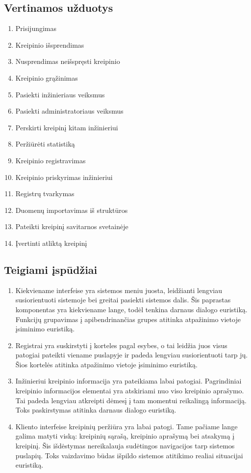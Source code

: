 \newpage	

\subsection{Vertinamos užduotys}
	\begin{enumerate}
	\item Prisijungimas
	\item Kreipinio išsprendimas
	\item Nusprendimas neišspręsti kreipinio
	\item Kreipinio grąžinimas
	\item Pasiekti inžinieriaus veiksmus
	\item Pasiekti administratoriaus veiksmus
	\item Perskirti kreipinį kitam inžinieriui
	\item Peržiūrėti statistiką
	\item Kreipinio registravimas
	\item Kreipinio priskyrimas inžinieriui
	\item Registrų tvarkymas
	\item Duomenų importavimas iš struktūros
	\item Pateikti kreipinį savitarnos svetainėje
	\item Įvertinti atliktą kreipinį
	\end{enumerate}
	
\newpage	
	
\subsection{Teigiami įspūdžiai}
	\begin{enumerate}
	\item Kiekviename interfeise yra sistemos meniu juosta, leidžianti lengviau susiorientuoti sistemoje bei greitai pasiekti sistemos dalis.
	Šis paprastas komponentas yra kiekviename lange, todėl tenkina darnaus dialogo euristiką.
	Funkcijų grupavimas į apibendrinančias grupes atitinka atpažinimo vietoje įsiminimo euristiką.
	\item Registrai yra suskirstyti į korteles pagal esybes, o tai leidžia juos visus patogiai pateikti viename puslapyje ir padeda lengviau susiorientuoti tarp jų.
	Šios kortelės atitinka atpažinimo vietoje įsiminimo euristiką.
	\item Inžinieriui kreipinio informacija yra pateikiama labai patogiai. Pagrindiniai kreipinio informacijos elementai yra atskiriami nuo viso kreipinio aprašymo.
	Tai padeda lengviau atkreipti dėmesį į tam momentui reikalingą informaciją.
	Toks paskirstymas atitinka darnaus dialogo euristiką.
	\item Kliento interfeise kreipinių peržiūra yra labai patogi.
	Tame pačiame lange galima matyti viską: kreipinių sąrašą, kreipinio aprašymą bei atsakymą į kreipinį.
	Šis išdėstymas nereikalauja sudėtingos navigacijos tarp sistemos puslapių.
	Toks vaizdavimo būdas išpildo sistemos atitikimo realiai situacijai euristiką.
	\end{enumerate}
	
